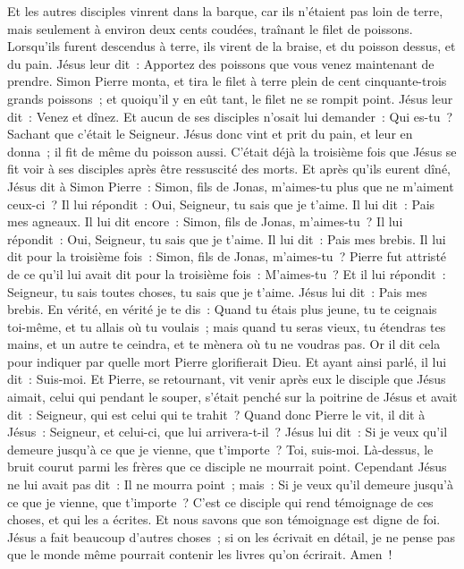 \begin{multicols}{2}
Et les autres disciples vinrent dans la barque, car ils n'étaient pas loin de terre, mais seulement à environ deux cents coudées, traînant le filet de poissons.
Lorsqu'ils furent descendus à terre, ils virent de la braise, et du poisson dessus, et du pain.
Jésus leur dit~: Apportez des poissons que vous venez maintenant de prendre.
Simon Pierre monta, et tira le filet à terre plein de cent cinquante-trois grands poissons~; et quoiqu'il y en eût tant, le filet ne se rompit point.
Jésus leur dit~: Venez et dînez. Et aucun de ses disciples n'osait lui demander~: Qui es-tu~? Sachant que c'était le Seigneur.
Jésus donc vint et prit du pain, et leur en donna~; il fit de même du poisson aussi.
C'était déjà la troisième fois que Jésus se fit voir à ses disciples après être ressuscité des morts.
Et après qu'ils eurent dîné, Jésus dit à Simon Pierre~: Simon, fils de Jonas, m'aimes-tu plus que ne m'aiment ceux-ci~? Il lui répondit~: Oui, Seigneur, tu sais que je t'aime. Il lui dit~: Pais mes agneaux.
Il lui dit encore~: Simon, fils de Jonas, m'aimes-tu~? Il lui répondit~: Oui, Seigneur, tu sais que je t'aime. Il lui dit~: Pais mes brebis.
Il lui dit pour la troisième fois~: Simon, fils de Jonas, m'aimes-tu~? Pierre fut attristé de ce qu'il lui avait dit pour la troisième fois~: M'aimes-tu~? Et il lui répondit~: Seigneur, tu sais toutes choses, tu sais que je t'aime. Jésus lui dit~: Pais mes brebis.
En vérité, en vérité je te dis~: Quand tu étais plus jeune, tu te ceignais toi-même, et tu allais où tu voulais~; mais quand tu seras vieux, tu étendras tes mains, et un autre te ceindra, et te mènera où tu ne voudras pas.
Or il dit cela pour indiquer par quelle mort Pierre glorifierait Dieu. Et ayant ainsi parlé, il lui dit~: Suis-moi.
Et Pierre, se retournant, vit venir après eux le disciple que Jésus aimait, celui qui pendant le souper, s'était penché sur la poitrine de Jésus et avait dit~: Seigneur, qui est celui qui te trahit~?
Quand donc Pierre le vit, il dit à Jésus~: Seigneur, et celui-ci, que lui arrivera-t-il~?
Jésus lui dit~: Si je veux qu'il demeure jusqu'à ce que je vienne, que t'importe~? Toi, suis-moi.
Là-dessus, le bruit courut parmi les frères que ce disciple ne mourrait point. Cependant Jésus ne lui avait pas dit~: Il ne mourra point~; mais~: Si je veux qu'il demeure jusqu'à ce que je vienne, que t'importe~?
C'est ce disciple qui rend témoignage de ces choses, et qui les a écrites. Et nous savons que son témoignage est digne de foi.
Jésus a fait beaucoup d'autres choses~; si on les écrivait en détail, je ne pense pas que le monde même pourrait contenir les livres qu'on écrirait. Amen~!
\PPE{}
\end{multicols}
